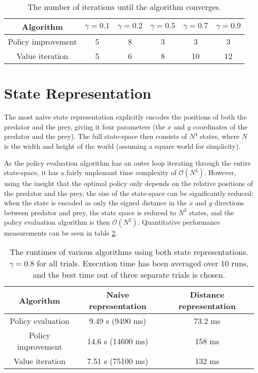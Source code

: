 \documentclass[a4paper, 12pt]{article}
\begin{document}
\begin{table}[htb]
	\begin{tabular}{|c|c|c|c|c|c|}
		\hline
		Algorithm & $\gamma = 0.1$ & $\gamma = 0.2$ & $\gamma = 0.5$ & $\gamma =
		0.7$ & $\gamma = 0.9$ \\
		\hline
		Policy improvement & 5 & 8 & 3 & 3 & 3 \\
		Value iteration & 5 & 6 & 8 & 10 & 12 \\
		\hline
	\end{tabular}
	\caption{The number of iterations until the algorithm converges.}
	\label{tbl:algo_convergence}
\end{table}

\section*{State Representation}
The most naive state representation explicitly encodes the positions of both the
predator and the prey, giving it four parameters (the $x$ and $y$ coordinates of
the predator and the prey). The full state-space then consists of $N^4$ states,
where $N$ is the width and height of the world (assuming a square world for
simplicity).

As the policy evaluation algorithm has an outer loop iterating through the
entire state-space, it has a fairly unpleasant time complexity of
$\mathcal{O}(N^4)$. However, using the insight that the optimal policy only
depends on the relative positions of the predator and the prey, the size of the
state-space can be significantly reduced: when the state is encoded as only the
signed distance in the $x$ and $y$ directions between predator and prey, the
state space is reduced to $N^2$ states, and the policy evaluation algorithm is
then $\mathcal{O}(N^2)$. Quantitative performance measurements can be seen in table
\ref{tbl:performance}.

\begin{table}[htb]
	\begin{tabular}{|c|c|c|}
		\hline
		Algorithm & Naive representation & Distance representation \\
		\hline
		Policy evaluation & 9.49 s (9490 ms) & 73.2 ms \\
		Policy improvement & 14.6 s (14600 ms) & 158 ms \\
		Value iteration & 7.51 s (75100 ms)& 132 ms \\
		\hline
	\end{tabular}
	\caption{The runtimes of various algorithms using both state representations.
		$\gamma = 0.8$ for all trials. Execution time has been averaged over 10
		runs, and the best time out of three separate trials is chosen.}
	\label{tbl:performance}
\end{table}
\end{document}
